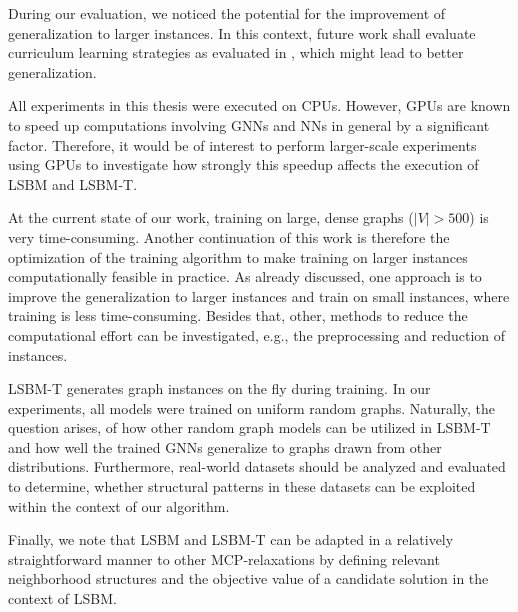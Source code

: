 \documentclass[draft,final]{vutinfth} %
\begin{document}
During our evaluation, we noticed the potential for the improvement of generalization to larger instances. In this context, future work shall evaluate curriculum learning strategies as evaluated in \cite{Lisicki2020}, which might lead to better generalization. 

All experiments in this thesis were executed on CPUs. However, GPUs are known to speed up computations involving GNNs and NNs in general by a significant factor. Therefore, it would be of interest to perform larger-scale experiments using GPUs to investigate how strongly this speedup affects the execution of LSBM and LSBM-T. 

At the current state of our work, training on large, dense graphs ($|V| > 500$) is very time-consuming. 
Another continuation of this work is therefore the optimization of the training algorithm to make training on larger instances computationally feasible in practice. 
As already discussed, one approach is to improve the generalization to larger instances and train on small instances, where training is less time-consuming. 
Besides that, other, methods to reduce the computational effort can be investigated, e.g., the preprocessing and reduction of instances. 

LSBM-T generates graph instances on the fly during training. In our experiments, all models were trained on uniform random graphs. 
Naturally, the question arises, of how other random graph models can be utilized in LSBM-T and how well the trained GNNs generalize to graphs drawn from other distributions. Furthermore, real-world datasets should be analyzed and evaluated to determine, whether structural patterns in these datasets can be exploited within the context of our algorithm. 

Finally, we note that LSBM and LSBM-T can be adapted in a relatively straightforward manner to other MCP-relaxations by defining relevant neighborhood structures and the objective value of a candidate solution in the context of LSBM. 

\end{document}
